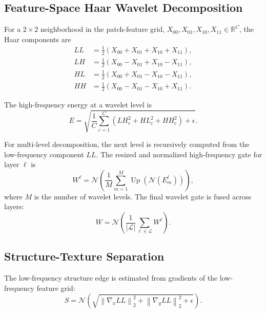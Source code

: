 \subsection{Feature-Space Haar Wavelet Decomposition}
\label{subsec:formula_wavelet_decomposition}

For a $2\times2$ neighborhood in the patch-feature grid,
$X_{00},X_{01},X_{10},X_{11}\in\mathbb{R}^{C}$, the Haar components are
\begin{align}
  LL &= \frac{1}{2}(X_{00}+X_{01}+X_{10}+X_{11}), \\
  LH &= \frac{1}{2}(X_{00}-X_{01}+X_{10}-X_{11}), \\
  HL &= \frac{1}{2}(X_{00}+X_{01}-X_{10}-X_{11}), \\
  HH &= \frac{1}{2}(X_{00}-X_{01}-X_{10}+X_{11}).
\end{align}

The high-frequency energy at a wavelet level is
\begin{equation}
  E =
  \sqrt{
    \frac{1}{C}
    \sum_{c=1}^{C}
    \left( LH_c^2 + HL_c^2 + HH_c^2 \right)
    + \epsilon
  } .
\end{equation}

For multi-level decomposition, the next level is recursively computed from
the low-frequency component $LL$. The resized and normalized high-frequency
gate for layer $\ell$ is
\begin{equation}
  W^{\ell}
  =
  \mathcal{N}
  \left(
    \frac{1}{M}\sum_{m=1}^{M}
    \operatorname{Up}\left(\mathcal{N}(E_m^{\ell})\right)
  \right),
\end{equation}
where $M$ is the number of wavelet levels. The final wavelet gate is fused
across layers:
\begin{equation}
  W = \mathcal{N}
  \left(
    \frac{1}{|\mathcal{L}|}
    \sum_{\ell\in\mathcal{L}} W^{\ell}
  \right).
\end{equation}

\subsection{Structure-Texture Separation}
\label{subsec:formula_structure_texture}

The low-frequency structure edge is estimated from gradients of the
low-frequency feature grid:
\begin{equation}
  S =
  \mathcal{N}
  \left(
    \sqrt{
      \left\|\nabla_x LL\right\|_2^2
      +
      \left\|\nabla_y LL\right\|_2^2
      + \epsilon
    }
  \right).
\end{equation}

